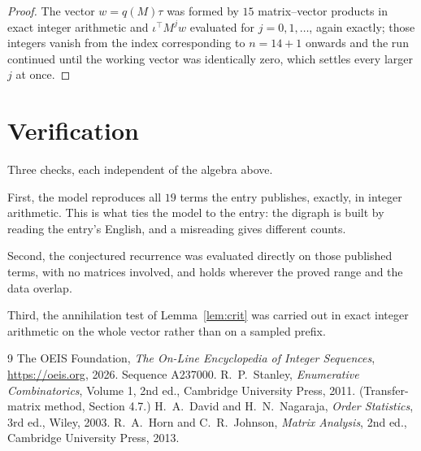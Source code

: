 \documentclass[11pt,a4paper]{article}
\theoremstyle{plain}
\theoremstyle{definition}
\begin{document}
\begin{proof}
The vector $w=q(M)\tau$ was formed by $15$ matrix--vector products in exact integer
arithmetic and $\iota^{\!\top}M^{j}w$ evaluated for $j=0,1,\dots$, again exactly; those
integers vanish from the index corresponding to $n=14+1$ onwards and the run continued
until the working vector was identically zero, which settles every larger $j$ at once.
\end{proof}

\section{Verification}

Three checks, each independent of the algebra above.

First, the model reproduces all $19$ terms the entry publishes, exactly, in integer
arithmetic. This is what ties the model to the entry: the digraph is built by reading the
entry's English, and a misreading gives different counts.

Second, the conjectured recurrence was evaluated directly on those published terms, with no
matrices involved, and holds wherever the proved range and the data overlap.

Third, the annihilation test of Lemma~\ref{lem:crit} was carried out in exact integer
arithmetic on the whole vector rather than on a sampled prefix.

\begin{thebibliography}{9}
 The OEIS Foundation, \emph{The On-Line Encyclopedia of Integer
Sequences}, \url{https://oeis.org}, 2026. Sequence A237000.
 R.~P.~Stanley, \emph{Enumerative Combinatorics}, Volume 1, 2nd ed.,
Cambridge University Press, 2011. (Transfer-matrix method, Section 4.7.)
 H.~A.~David and H.~N.~Nagaraja, \emph{Order Statistics}, 3rd ed., Wiley,
2003.
 R.~A.~Horn and C.~R.~Johnson, \emph{Matrix Analysis}, 2nd ed., Cambridge
University Press, 2013.
\end{thebibliography}
\end{document}
